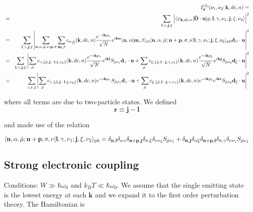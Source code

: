 \documentclass[pt12]{article}
\newcommand{\beq}{\begin{equation}}
\newcommand{\eeq}{\end{equation}}
\newcommand{\bfk}{\mathbf{k}}
\newcommand{\bfr}{\mathbf{r}}
\newcommand{\bfn}{\mathbf{n}}
\newcommand{\bfm}{\mathbf{m}}
\newcommand{\bfd}{\mathbf{d}}
\newcommand{\bfu}{\mathbf{u}}
\newcommand{\bfl}{\mathbf{l}}
\newcommand{\bfp}{\mathbf{p}}
\newcommand{\bfj}{\mathbf{j}}
\newcommand{\tmu}{\tilde{\mu}}
\newcommand{\umu}{\underline{\mu}}
\begin{document}
\begin{eqnarray}
&&I_\bfu^{(2)}(\nu_1,\nu_2;\bfk,dc,n) =  \\ \nonumber
&=& \sum_{\bfl,\gamma,\bfj,\xi}\left|\langle\psi_{\bfk,dc,n}|\hat{\mathbf{D}}\cdot
\mathbf{u} |g;\bfl,\gamma,\nu_1;\bfj,\xi,\nu_2\rangle\right|^2\\ \nonumber
%
&=&\sum_{\bfl,\gamma,\bfj,\xi}\left|\sum_{\bfn,\alpha,\tmu,\nu,\bfp,\sigma}\sum_{\bfm,\beta}
c_{\alpha,\umu}(\bfk,dc,n) \frac{e^{-i\bfk
\mathbf{\rho}_\alpha}}{\sqrt{N}} e^{i \bfk \bfn} \langle
\bfn,\alpha|\bfm,\beta\rangle_{\rm el}
\langle\bfn,\alpha,\tmu;\bfn+\bfp,\sigma,\nu|\bfl,\gamma,\nu_1;\bfj,\xi,\nu_2\rangle_{\rm ph} \bfd_\beta\cdot
\mathbf{u}\right|^2
%
\\ \nonumber
&=&\sum_{\bfl,\gamma,\bfj,\xi}\left| \sum_{\tmu}
c_{\gamma,\{\tmu,\bfj-\bfl,\xi,\nu_2\}}(\bfk,dc,n) \frac{e^{-i\bfk
\mathbf{\rho}_\gamma}}{\sqrt{N}} e^{i \bfk \bfl}S_{\tmu\nu_1} \bfd_\gamma\cdot
\mathbf{u}+ 
\sum_{\tmu}
c_{\xi,\{\tmu,\bfl-\bfj,\gamma,\nu_1\}}(\bfk,dc,n) \frac{e^{-i\bfk
\mathbf{\rho}_\xi}}{\sqrt{N}} e^{i \bfk \bfj}S_{\tmu\nu_2} \bfd_\xi\cdot
\mathbf{u}\right|^2 \\ \nonumber
%
&=&\sum_{\gamma,\bfr,\xi}\left| \sum_{\tmu}
c_{\gamma,\{\tmu,\bfj-\bfl,\xi,\nu_2\}}(\bfk,dc,n) e^{-i\bfk
\mathbf{\rho}_\gamma} S_{\tmu\nu_1} \bfd_\gamma\cdot
\mathbf{u}+ 
\sum_{\tmu}
c_{\xi,\{\tmu,\bfl-\bfj,\gamma,\nu_1\}}(\bfk,dc,n) e^{-i\bfk
\mathbf{\rho}_\xi}e^{i \bfk \bfr}S_{\tmu\nu_2} \bfd_\xi\cdot
\mathbf{u}\right|^2 
\end{eqnarray}

where all terms are due to two-particle states.  We defined 
\beq
\bfr\equiv\bfj-\bfl
\eeq

and made use of the relation

\beq
\langle\bfn,\alpha,\tmu;\bfn+\bfp,\sigma,\nu|\bfl,\gamma,\nu_1;\bfj,\xi,\nu_2\rangle_{\rm ph} =\delta_{\bfn,\bfl} \delta_{\alpha\gamma} \delta_{\bfn+\bfp,\bfj} \delta_{\sigma,\xi} \delta_{\nu \nu_2} S_{\tmu\nu_1}+\delta_{\bfn,\bfj} \delta_{\alpha\xi} \delta_{\bfn+\bfp,\bfl} \delta_{\sigma,\gamma} \delta_{\nu \nu_1} S_{\tmu\nu_2}
\eeq

\subsection{Strong electronic coupling}

Conditions: $W\gg\hbar\omega_0$ and $k_B T \ll \hbar\omega_0$. We
assume that the single emitting state is the lowest energy at each
$\bfk$ and we expand it to the first order perturbation theory. The
Hamiltonian is
\end{document}
